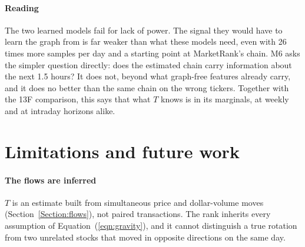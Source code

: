 \documentclass[preprint,3p,twocolumn]{elsarticle}
\newcommand{\MR}{MarketRank}
\begin{document}
\begin{table}[t]
\centering
\caption{Pre-registered tests of the connectivity. Oracle IC is the IC of the planted signal on synthetic markets, the ceiling for any model. Detection means the variant beats every listed control at $t>2$; M6 also requires a positive difference in at least two thirds of months.}
\label{Table:learned}
\small\setlength{\tabcolsep}{4pt}
\end{table}

\paragraph{Reading} The two learned models fail for lack of power. The signal they would have to learn the graph from is far weaker than what these models need, even with 26 times more samples per day and a starting point at \MR's chain. M6 asks the simpler question directly: does the estimated chain carry information about the next 1.5 hours? It does not, beyond what graph-free features already carry, and it does no better than the same chain on the wrong tickers. Together with the 13F comparison, this says that what $T$ knows is in its marginals, at weekly and at intraday horizons alike.

\section{Limitations and future work}
\label{Section:limits}

\paragraph{The flows are inferred} $T$ is an estimate built from simultaneous price and dollar-volume moves (Section~\ref{Section:flows}), not paired transactions. The rank inherits every assumption of Equation~(\ref{eqn:gravity}), and it cannot distinguish a true rotation from two unrelated stocks that moved in opposite directions on the same day.
\end{document}
